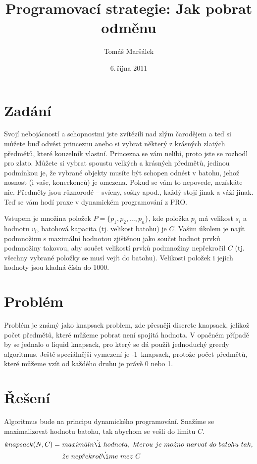 \documentclass[11pt]{article}
\title{Programovací strategie: Jak pobrat odměnu}
\author{Tomáš Maršálek}
\date{6.\,října 2011}
\begin{document}
\maketitle

\section{Zadání}
Svojí nebojácností a schopnostmi jste zvítězili nad zlým čarodějem a teď si 
můžete buď odvést princeznu anebo si vybrat některý z krásných zlatých předmětů,
které kouzelník vlastní. Princezna se vám nelíbí, proto jste se rozhodl pro 
zlato. Můžete si vybrat spoustu velkých a krásných předmětů, jedinou podmínkou
je, že vybrané objekty musíte být schopen odnést v batohu, jehož nosnost 
(i vaše, koneckonců) je omezena. Pokud se vám to nepovede, nezískáte nic. 
Předměty jsou různorodé – svícny, sošky apod., každý stojí jinak a váží jinak. 
Teď se vám hodí praxe v dynamickém programování z PRO.

Vstupem je množina položek $P=\{p_1,p_2,\ldots,p_n\}$, kde položka $p_i$ má 
velikost $s_i$ a hodnotu $v_i$, batohová kapacita (tj. velikost batohu) je $C$. 
Vašim úkolem je najít podmnožinu s maximální hodnotou zjištěnou jako součet 
hodnot prvků podmnožiny takovou, aby součet velikostí prvků podmnožiny 
nepřekročil $C$ (tj. všechny vybrané položky se musí vejít do batohu). 
Velikosti položek i jejich hodnoty jsou kladná čísla do 1000.

\section{Problém}
Problém je známý jako {\sc knapsack problem}, zde přesněji 
{\sc discrete knapsack}, jelikož počet předmětů, které můžeme pobrat není 
spojitá hodnota. V opačném případě by se jednalo o {\sc liquid knapsack}, 
pro který se dá použít jednoduchý greedy algoritmus. Ještě speciálnější 
vymezení je {-1~knapsack}, protože počet předmětů, 
které můžeme vzít od každého druhu je právě 0 nebo 1.

\section{Řešení}
Algoritmus bude na principu dynamického programování. Snažíme se maximalizovat
hodnotu batohu, tak abychom se vešli do limitu $C$.
\begin{align*}
knapsack(N, C) =\ &maxim\acute{a}ln\acute{\i}\ hodnota,\ kterou\ je\ 
mo\check{z}no\ narvat\ do\ batohu\ tak, \\
 &\check{z}e\ nep\check{r}ekro\check{c}\acute{\i}me\ mez\ C 
\end{align*}
\end{document}
